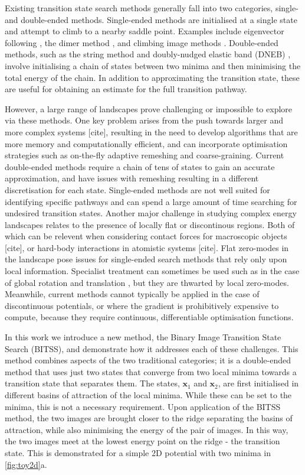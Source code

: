 \documentclass[aps,prl,twocolumn,groupedaddress]{revtex4}
\newcommand{\temp}[1]{{\leavevmode\color{red}#1}}
\begin{document}
\topic Existing transition state search methods generally fall into two categories, single- and double-ended methods.
Single-ended methods are initialised at a single state and attempt to climb to a nearby saddle point.
Examples include eigenvector following \cite{Cerjan1981}, the dimer method \cite{Heyden2005,Kastner2008}, and climbing image methods \cite{E2007,Ren2013}.
Double-ended methods, such as the string method \cite{E2002,E2007} and doubly-nudged elastic band (DNEB) \cite{Trygubenko2004}, involve initialising a chain of states between two minima and then minimising the total energy of the chain.
In addition to approximating the transition state, these are useful for obtaining an estimate for the full transition pathway.

\topic However, a large range of landscapes prove challenging or impossible to explore via these methods.
One key problem arises from the push towards larger and more complex systems \temp{[cite]}, resulting in the need to develop algorithms that are more memory and computationally efficient, and can incorporate optimisation strategies such as on-the-fly adaptive remeshing and coarse-graining.
Current double-ended methods require a chain of tens of states to gain an accurate approximation, and have issues with remeshing resulting in a different discretisation for each state.
Single-ended methods are not well suited for identifying specific pathways and can spend a large amount of time searching for undesired transition states.
Another major challenge in studying complex energy landscapes relates to the presence of locally flat or discontinous regions.
Both of which can be relevent when considering contact forces for macroscopic objects \temp{[cite]}, or hard-body interactions in atomistic systems \temp{[cite]}.
Flat zero-modes in the landscape pose issues for single-ended search methods that rely only upon local information.
Specialist treatment can sometimes be used such as in the case of global rotation and translation \temp{\cite{Wales2004}}, but they are thwarted by local zero-modes.
Meanwhile, current methods cannot typically be applied in the case of discontinuous potentials, or where the gradient is prohibitively expensive to compute, because they require continuous, differentiable optimisation functions.

\topic In this work we introduce a new method, the Binary Image Transition State Search (BITSS), and demonstrate how it addresses each of these challenges.
This method combines aspects of the two traditional categories; it is a double-ended method that uses just two states that converge from two local minima towards a transition state that separates them.
The states, $\bm{x}_1$ and $\bm{x}_2$, are first initialised in different basins of attraction of the local minima.
While these can be set to the minima, this is not a necessary requirement.
Upon application of the BITSS method, the two images are brought closer to the ridge separating the basins of attraction, while also minimising the energy of the pair of images.
In this way, the two images meet at the lowest energy point on the ridge - the transition state.
This is demonstrated for a simple 2D potential with two minima in \cref{fig:toy2d}a.
\end{document}
